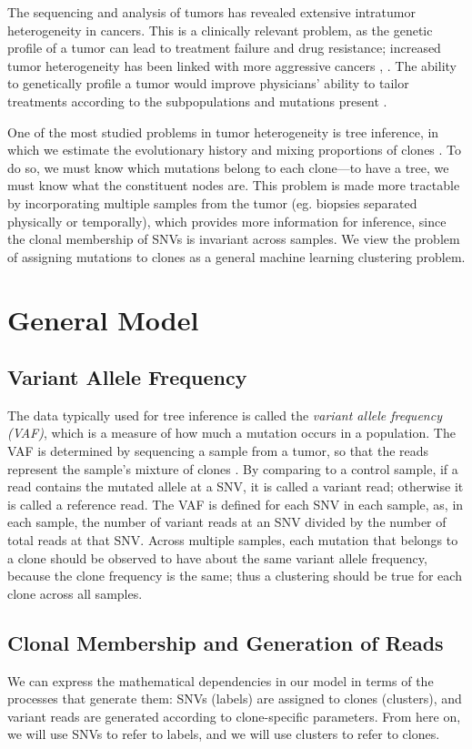 \documentclass[11pt]{article}
\begin{document}
The sequencing and analysis of tumors has revealed extensive intratumor heterogeneity in cancers. This is a clinically relevant problem, as the genetic profile of a tumor can lead to treatment failure and drug resistance; increased tumor heterogeneity has been linked with more aggressive cancers \cite{Gerlinger2012}, \cite{McGranahan2015}. The ability to genetically profile a tumor would improve physicians' ability to tailor treatments according to the subpopulations and mutations present \cite{Raphael2014}. 

One of the most studied problems in tumor heterogeneity is tree inference, in which we estimate the evolutionary history and mixing proportions of clones \cite{Ancestree}. To do so, we must know which mutations belong to each clone---to have a tree, we must know what the constituent nodes are. This problem is made more tractable by incorporating multiple samples from the tumor (eg. biopsies separated physically or temporally), which provides more information for inference, since the clonal membership of SNVs is invariant across samples. We view the problem of assigning mutations to clones as a general machine learning clustering problem.

\section{General Model}
\subsection{Variant Allele Frequency}
The data typically used for tree inference is called the \emph{variant allele frequency (VAF)}, which is a measure of how much a mutation occurs in a population. The VAF is determined by sequencing a sample from a tumor, so that the reads represent the sample's mixture of clones \cite{Ding2012}. By comparing to a control sample, if a read contains the mutated allele at a SNV, it is called a variant read; otherwise it is called a reference read. The VAF is defined for each SNV in each sample, as, in each sample, the number of variant reads at an SNV divided by the number of total reads at that SNV. Across multiple samples, each mutation that belongs to a clone should be observed to have about the same variant allele frequency, because the clone frequency is the same; thus a clustering should be true for each clone across all samples.

\subsection{Clonal Membership and Generation of Reads}
We can express the mathematical dependencies in our model in terms of the processes that generate them: SNVs (labels) are assigned to clones (clusters), and variant reads are generated according to clone-specific parameters. From here on, we will use SNVs to refer to labels, and we will use clusters to refer to clones.
\end{document}

